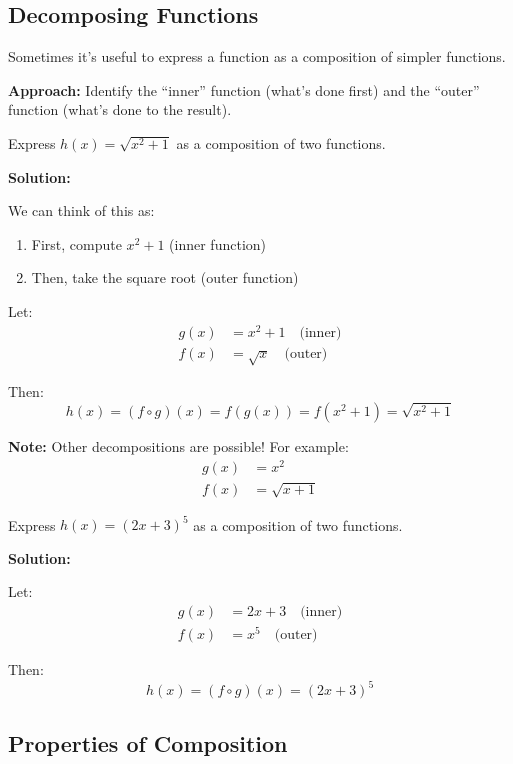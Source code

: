 \documentclass[12pt,a4paper]{article}
\begin{document}
\subsection{Decomposing Functions}

\begin{strategy}
Sometimes it's useful to express a function as a composition of simpler functions.

\textbf{Approach:} Identify the ``inner'' function (what's done first) and the ``outer'' function (what's done to the result).
\end{strategy}

\begin{example}
Express $h(x) = \sqrt{x^2 + 1}$ as a composition of two functions.

\textbf{Solution:}

We can think of this as:
\begin{enumerate}
    \item First, compute $x^2 + 1$ (inner function)
    \item Then, take the square root (outer function)
\end{enumerate}

Let:
\begin{align*}
g(x) &= x^2 + 1 \quad \text{(inner)} \\
f(x) &= \sqrt{x} \quad \text{(outer)}
\end{align*}

Then:
\[
h(x) = (f \circ g)(x) = f(g(x)) = f(x^2 + 1) = \sqrt{x^2 + 1}
\]

\textbf{Note:} Other decompositions are possible! For example:
\begin{align*}
g(x) &= x^2 \\
f(x) &= \sqrt{x + 1}
\end{align*}
\end{example}

\begin{example}
Express $h(x) = (2x + 3)^5$ as a composition of two functions.

\textbf{Solution:}

Let:
\begin{align*}
g(x) &= 2x + 3 \quad \text{(inner)} \\
f(x) &= x^5 \quad \text{(outer)}
\end{align*}

Then:
\[
h(x) = (f \circ g)(x) = (2x + 3)^5
\]
\end{example}

\subsection{Properties of Composition}
\end{document}
